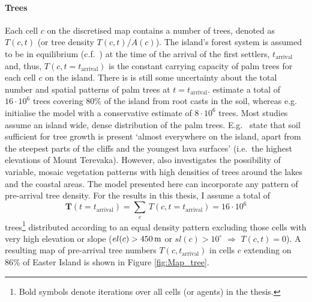 \paragraph{Trees}
Each cell $c$ on the discretised map contains a number of trees, denoted as $T(c,t)$ (or tree density $T(c,t)/A(c)$).
The island's forest system is assumed to be in equilibrium (c.f.\ \citet{Brander1998}) at the time of the arrival of the first settlers, $t_\text{arrival}$ and, thus, $T(c,t=t_\text{arrival})$ is the constant carrying capacity of palm trees for each cell $c$ on the island. 
There is is still some uncertainty about the total number and spatial patterns of palm trees at $t=t_\text{arrival}$.
\citet{Mieth2015} estimate a total of $16\cdot 10^6$ trees covering $80\%$ of the island from root casts in the soil, whereas e.g.\ \citet{Brandt2015} initialise the model with a conservative estimate of $8\cdot 10^6$ trees. 
Most studies assume an island wide, dense distribution of the palm trees. 
E.g.\ \citet{Bahn2017} state that soil sufficient for tree growth is present `almost everywhere on the island, apart from the steepest parts of the cliffs and the youngest lava surfaces' (i.e.\ the highest elevations of Mount Terevaka). 
However, \citet{Rull2020} also investigates the possibility of variable, mosaic vegetation patterns with high densities of trees around the lakes and the coastal areas.
The model presented here can incorporate any pattern of pre-arrival tree density. 
For the results in this thesis, I assume 
a total of 
\begin{equation}
\mathbf{T}(t=t_\text{arrival}) = \sum_{c} \, T(c,t=t_\text{arrival}) =  16 \cdot 10^6
\end{equation} 
trees\footnote{Bold symbols denote iterations over all cells (or agents) in the thesis.} distributed according to an equal density pattern excluding those cells with very high elevation or slope ($el(c)>450\, {\rm m}$ or $sl(c)>10^\circ$ $\Rightarrow$ $T(c,t) = 0$).
A resulting map of pre-arrival tree numbers $T(c,t_\text{arrival})$ in cells $c$ extending on $86\%$ of Easter Island is shown in Figure \ref{fig:Map_tree}.

